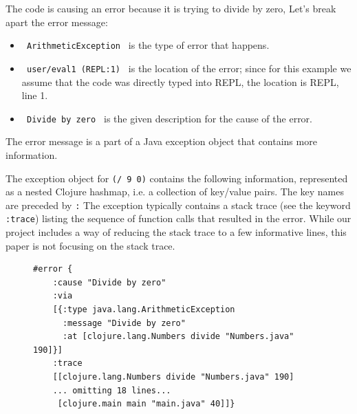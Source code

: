 \documentclass[12pt]{article}
\begin{document}
The code is causing an error because it is trying to divide by zero, Let's break apart the error message:
	\begin{itemize}
		\item \texttt{ ArithmeticException } is the type of error that happens.
		\item \texttt{ user/eval1 (REPL:1) } is the location of the error; since for this example we assume that the code was directly typed into REPL, the location is REPL, line 1. 
		\item \texttt{ Divide by zero } is the given description for the cause of the error.
	\end{itemize}
The error message is a part of a Java exception object that contains more information. 

The exception object for \texttt{(/ 9 0)} contains the following information, represented as a nested Clojure hashmap, 
i.e. a collection of key/value pairs. The key names are preceded by \texttt{:} The exception typically contains a stack trace (see the keyword \texttt{:trace}) listing the sequence of function calls that resulted in the error. While our project includes a way of reducing the stack trace to a few informative lines, this paper is not focusing on the stack trace. 
	\begin{figure}[h]
		\centering
		\begin{lstlisting}[breaklines=true, basicstyle=\ttfamily]
#error {
	:cause "Divide by zero"
	:via
	[{:type java.lang.ArithmeticException
	  :message "Divide by zero"
	  :at [clojure.lang.Numbers divide "Numbers.java" 190]}]
	:trace
	[[clojure.lang.Numbers divide "Numbers.java" 190]
	... omitting 18 lines...
	 [clojure.main main "main.java" 40]]}

		\end{lstlisting}
	\end{figure}
	
\end{document}
